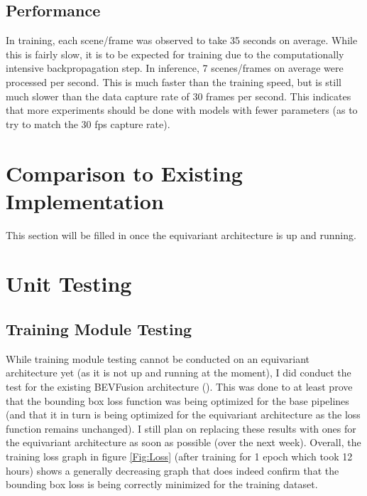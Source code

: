 \documentclass[12pt, titlepage]{article}
\begin{document}
\subsection{Performance}

In training, each scene/frame was observed to take 35 seconds on average. While this is fairly slow, it is to be expected for training due to the computationally intensive backpropagation step. In inference, 7 scenes/frames on average were 
processed per second. This is much faster than the training speed, but is still much slower than the data capture rate of 30 frames per second. This indicates that more experiments should be done with models with fewer parameters (as to try to match the 30 fps capture rate).
	
\section{Comparison to Existing Implementation}	

This section will be filled in once the equivariant architecture is up and running.

\section{Unit Testing}

\subsection{Training Module Testing}

While training module testing cannot be conducted on an equivariant architecture yet (as it is not up and running at the moment), I did conduct the test for the existing 
BEVFusion architecture (\cite{liang2022bevfusion}). This was done to at least prove that the bounding box loss function was being optimized for the base pipelines (and that it in turn is being optimized for the equivariant architecture as the loss function remains unchanged). 
I still plan on replacing these results with ones for the equivariant architecture as soon as possible (over the next week). Overall, the training loss graph in figure \ref{Fig:Loss} (after training for 1 epoch which took 12 hours) shows a generally decreasing graph that does indeed confirm that the bounding box loss is being correctly minimized for the training dataset.
\end{document}
